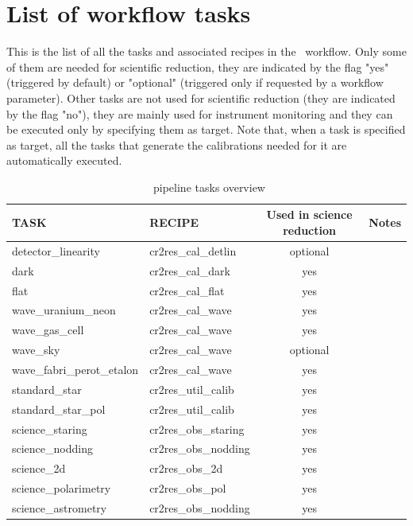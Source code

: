 \section{List of workflow tasks}

This is the list of all the tasks and associated recipes in the
\instname\ workflow.  Only some of them are needed for scientific
reduction, they are indicated by the flag "yes" (triggered by default)
or "optional" (triggered only if requested by a workflow
parameter). Other tasks are not used for scientific reduction (they
are indicated by the flag "no"), they are mainly used for instrument
monitoring and they can be executed only by specifying them as
target. Note that, when a task is specified as target, all the tasks
that generate the calibrations needed for it are automatically
executed.

\begin{table}[htbp]
\centering
\scriptsize
\begin{tabular}{|l|l|c|p{7cm}|}
\hline
\textbf{TASK} & \textbf{RECIPE} & \textbf{Used in science reduction} & \textbf{Notes} \\
\hline 
detector\_linearity        & cr2res\_cal\_detlin  & optional & \\
dark                       & cr2res\_cal\_dark    & yes & \\
flat                       & cr2res\_cal\_flat    & yes & \\
wave\_uranium\_neon        & cr2res\_cal\_wave    & yes & \\
wave\_gas\_cell            & cr2res\_cal\_wave    & yes & \\
wave\_sky                  & cr2res\_cal\_wave    & optional & \\
wave\_fabri\_perot\_etalon & cr2res\_cal\_wave    & yes & \\
standard\_star             & cr2res\_util\_calib  & yes & \\
standard\_star\_pol        & cr2res\_util\_calib  & yes & \\
science\_staring           & cr2res\_obs\_staring & yes & \\
science\_nodding           & cr2res\_obs\_nodding & yes & \\
science\_2d                & cr2res\_obs\_2d      & yes & \\
science\_polarimetry       & cr2res\_obs\_pol     & yes & \\
science\_astrometry        & cr2res\_obs\_nodding & yes & \\
\hline
\end{tabular}
\caption{\instname\ pipeline tasks overview}
\end{table}
